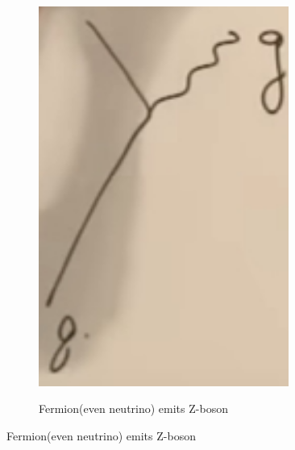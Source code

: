 \documentclass[]{article}
\begin{document}
\begin{figure}[H]
\begin{subfigure}[t]{0.3\textwidth}
		\includegraphics[width=0.9\textwidth]{2-a2-feynman2}
	\end{subfigure}
	\begin{subfigure}[t]{0.3\textwidth}
		\caption{Fermion(even neutrino) emits Z-boson}

\end{subfigure}
\end{figure}
\end{document}
